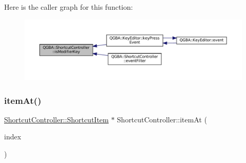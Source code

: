 Here is the caller graph for this function\+:
\nopagebreak
\begin{figure}[H]
\begin{center}
\leavevmode
\includegraphics[width=350pt]{class_q_g_b_a_1_1_shortcut_controller_aabad72de91824aeebe6593dfb16c1845_icgraph}
\end{center}
\end{figure}
\mbox{\label{class_q_g_b_a_1_1_shortcut_controller_a1920d0e239df0d95d87b95b2d286404c}} 
\subsubsection{\texorpdfstring{item\+At()}{itemAt()}\hspace{0.1cm}{\footnotesize\ttfamily [1/2]}}
{\footnotesize\ttfamily \mbox{\hyperlink{class_q_g_b_a_1_1_shortcut_controller_1_1_shortcut_item}{Shortcut\+Controller\+::\+Shortcut\+Item}} $\ast$ Shortcut\+Controller\+::item\+At (\begin{DoxyParamCaption}\item[{const Q\+Model\+Index \&}]{index }\end{DoxyParamCaption})\hspace{0.3cm}{\ttfamily [private]}}

